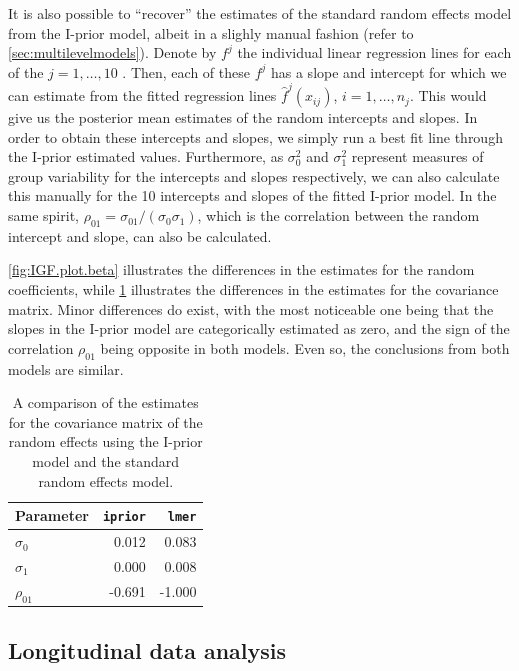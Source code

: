 \documentclass[showframe,11pt,twoside,openright]{report}\usepackage[]{graphicx}\usepackage{xcolor}
\begin{document}
It is also possible to ``recover'' the estimates of the standard random effects model from the I-prior model, albeit in a slighly manual fashion (refer to \cref{sec:multilevelmodels}).
Denote by $f^j$ the individual linear regression lines for each of the $j=1,\dots,10$ .
Then, each of these $f^j$ has a slope and intercept for which we can estimate from the fitted regression lines $\hat f^j(x_{ij})$, $i=1,\dots,n_j$.
This would give us the posterior mean estimates of the random intercepts and slopes.
In order to obtain these intercepts and slopes, we simply run a best fit line through the I-prior estimated  values.
Furthermore, as $\sigma_0^2$ and $\sigma_1^2$ represent measures of group variability for the intercepts and slopes respectively, we can also calculate this manually for the 10 intercepts and slopes of the fitted I-prior model.
In the same spirit, $\rho_{01} = \sigma_{01} / (\sigma_0 \sigma_1)$, which is the correlation between the random intercept and slope, can also be calculated.

\cref{fig:IGF.plot.beta} illustrates the differences in the estimates for the random coefficients, while  \cref{tab:igf} illustrates the differences in the estimates for the covariance matrix.
Minor differences do exist, with the most noticeable one being that the slopes in the I-prior model are categorically estimated as zero, and the sign of the correlation $\rho_{01}$ being opposite in both models.
Even so, the conclusions from both models are similar.

\begin{table}[htb]
\centering
\caption[A comparison of the estimates for the IGF data set]{A comparison of the estimates for the covariance matrix of the random effects using the I-prior model and the standard random effects model.}
\label{tab:igf}
\begin{tabular}{lrr}
\toprule
Parameter     & \texttt{iprior} & \texttt{lmer} \\
\midrule
$\sigma_0$    & 0.012 & 0.083 \\
$\sigma_1$    & 0.000 & 0.008 \\
$\rho_{01}$   & -0.691& -1.000 \\
\bottomrule
\end{tabular}
\end{table}

\subsection{Longitudinal data analysis}
\label{sec:cows}
\end{document}
